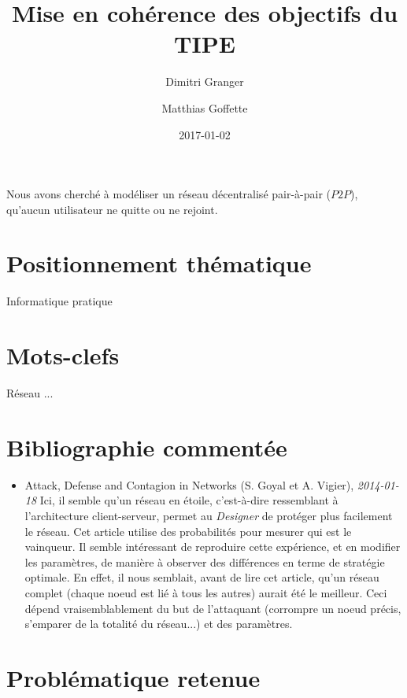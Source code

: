 \documentclass[11pt,a4paper]{article}
\title{Mise en cohérence des objectifs du TIPE}
\date{2017-01-02}
\author{Dimitri Granger \and Matthias Goffette}
\begin{document}

\maketitle

\begin{it}
Nous avons cherché à modéliser un réseau décentralisé pair-à-pair ($P2P$), qu'aucun utilisateur ne quitte ou ne rejoint.
\end{it}

\section{Positionnement thématique}

Informatique pratique


\section{Mots-clefs}

Réseau ...


\section{Bibliographie commentée}

\begin{itemize}

	\item Attack, Defense and Contagion in Networks (S. Goyal et A. Vigier), \emph{2014-01-18}
		Ici, il semble qu'un réseau en étoile, c'est-à-dire ressemblant à l'architecture client-serveur, permet au \emph{Designer} de protéger plus facilement le réseau. Cet article utilise des probabilités pour mesurer qui est le vainqueur. Il semble intéressant de reproduire cette expérience, et en modifier les paramètres, de manière à observer des différences en terme de stratégie optimale. En effet, il nous semblait, avant de lire cet article, qu'un réseau complet %
		(chaque noeud est lié à tous les autres) aurait été le meilleur. Ceci dépend vraisemblablement du but de l'attaquant (corrompre un noeud précis, s'emparer de la totalité du réseau...) et des paramètres.
	
\end{itemize}



\section{Problématique retenue}
\end{document}
